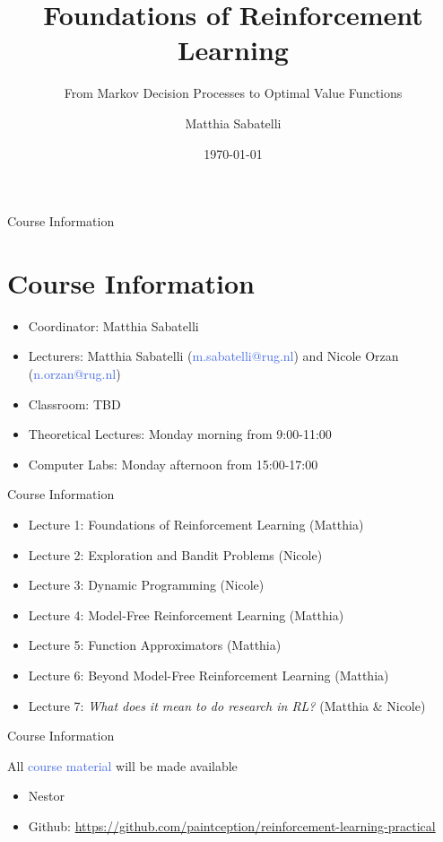 \documentclass{beamer}
\title{Foundations of Reinforcement Learning}
\subtitle{From Markov Decision Processes to Optimal Value Functions}
\author{Matthia Sabatelli}
\date{\today}
\begin{document}
\frame{\titlepage} 


\begin{frame}{Course Information}
	\section{Course Information}

	\begin{itemize}
		\item Coordinator: Matthia Sabatelli
		\item Lecturers: Matthia Sabatelli (\textcolor{RoyalBlue}{m.sabatelli@rug.nl}) and Nicole Orzan (\textcolor{RoyalBlue}{n.orzan@rug.nl})
		\item Classroom: TBD
		\item Theoretical Lectures: Monday morning from 9:00-11:00
		\item Computer Labs: Monday afternoon from 15:00-17:00
	\end{itemize}

\end{frame}


\begin{frame}{Course Information}

	\begin{itemize}
		\item Lecture 1: Foundations of Reinforcement Learning (Matthia)
		\item Lecture 2: Exploration and Bandit Problems (Nicole)
		\item Lecture 3: Dynamic Programming (Nicole)
		\item Lecture 4: Model-Free Reinforcement Learning (Matthia)
		\item Lecture 5: Function Approximators (Matthia) 
		\item Lecture 6: Beyond Model-Free Reinforcement Learning (Matthia)
		\item Lecture 7: \textit{What does it mean to do research in RL?} (Matthia \& Nicole)
	\end{itemize}

\end{frame}

\begin{frame}{Course Information}

	All \textcolor{RoyalBlue}{course material} will be made available

	\begin{itemize}
		\item Nestor
		\item Github: \url{https://github.com/paintception/reinforcement-learning-practical}
	\end{itemize}

\end{frame}
\end{document}
